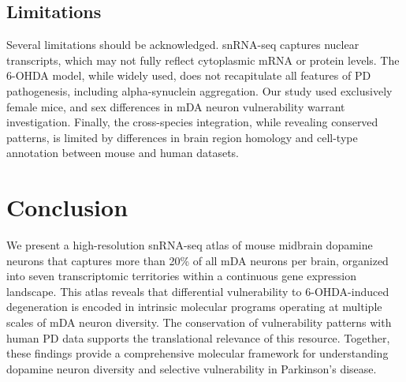 \documentclass[12pt]{article}
\begin{document}
\subsection{Limitations}

Several limitations should be acknowledged. snRNA-seq captures nuclear transcripts, which may not fully reflect cytoplasmic mRNA or protein levels. The 6-OHDA model, while widely used, does not recapitulate all features of PD pathogenesis, including alpha-synuclein aggregation. Our study used exclusively female mice, and sex differences in mDA neuron vulnerability warrant investigation. Finally, the cross-species integration, while revealing conserved patterns, is limited by differences in brain region homology and cell-type annotation between mouse and human datasets.

\section{Conclusion}

We present a high-resolution snRNA-seq atlas of mouse midbrain dopamine neurons that captures more than 20\% of all mDA neurons per brain, organized into seven transcriptomic territories within a continuous gene expression landscape. This atlas reveals that differential vulnerability to 6-OHDA-induced degeneration is encoded in intrinsic molecular programs operating at multiple scales of mDA neuron diversity. The conservation of vulnerability patterns with human PD data supports the translational relevance of this resource. Together, these findings provide a comprehensive molecular framework for understanding dopamine neuron diversity and selective vulnerability in Parkinson's disease.



\end{document}
